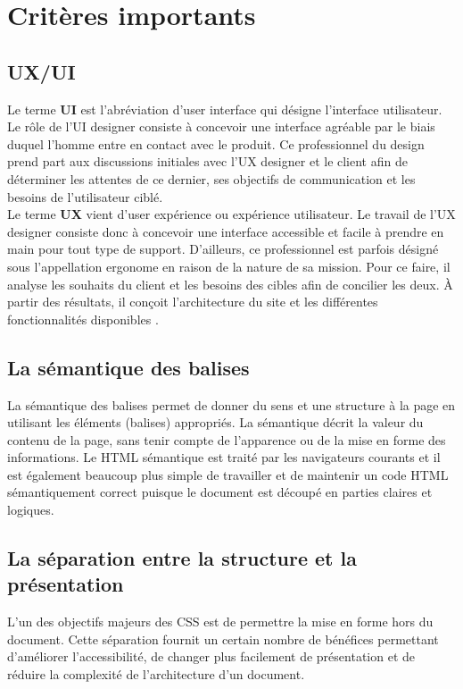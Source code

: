 \documentclass[a4paper, 12pt]{report}
\begin{document}
\section{Critères importants}
\subsection{UX/UI }
Le terme \textbf{UI} est l’abréviation d’user interface qui désigne l’interface utilisateur. Le rôle de l’UI designer consiste à concevoir une interface agréable par le biais duquel l’homme entre en contact avec le produit. Ce professionnel du design prend part aux discussions initiales avec l’UX designer et le client afin de déterminer les attentes de ce dernier, ses objectifs de communication et les besoins de l’utilisateur ciblé.\\
Le terme \textbf{UX} vient d’user expérience ou expérience utilisateur. Le travail de l’UX designer consiste donc à concevoir une interface accessible et facile à prendre en main pour tout type de support. D’ailleurs, ce professionnel est parfois désigné sous l’appellation ergonome en raison de la nature de sa mission. Pour ce faire, il analyse les souhaits du client et les besoins des cibles afin de concilier les deux. À partir des résultats, il conçoit l’architecture du site et les différentes fonctionnalités disponibles \cite{1}.
\subsection{La sémantique des balises }
La sémantique des balises permet de donner du sens et une structure à la page en utilisant les éléments (balises) appropriés. La sémantique décrit la valeur du contenu de la page, sans tenir compte de l’apparence ou de la mise en forme des informations. Le HTML sémantique est traité par les navigateurs courants et il est également beaucoup plus simple de travailler et de maintenir un code HTML sémantiquement correct puisque le document est découpé en parties claires et logiques. 
\subsection{La séparation entre la structure et la présentation}
 
L’un des objectifs majeurs des CSS est de permettre la mise en forme hors du document. Cette séparation fournit un certain nombre de bénéfices permettant d’améliorer l’accessibilité, de changer plus facilement de présentation et de réduire la complexité de l’architecture d’un document. 
\end{document}
